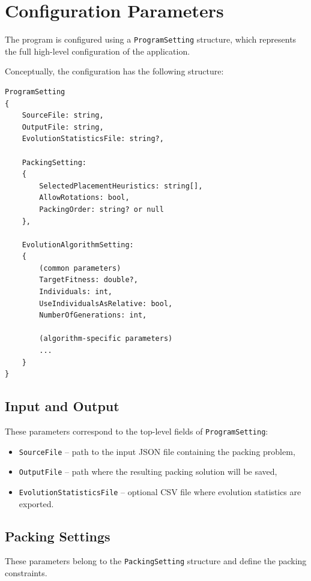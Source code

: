 \section{Configuration Parameters}

The program is configured using a \texttt{ProgramSetting} structure, which represents the full high-level configuration of the application.

Conceptually, the configuration has the following structure:

\begin{verbatim}
ProgramSetting
{
    SourceFile: string,
    OutputFile: string,
    EvolutionStatisticsFile: string?,

    PackingSetting:
    {
        SelectedPlacementHeuristics: string[],
        AllowRotations: bool,
        PackingOrder: string? or null
    },

    EvolutionAlgorithmSetting:
    {
        (common parameters)
        TargetFitness: double?,
        Individuals: int,
        UseIndividualsAsRelative: bool,
        NumberOfGenerations: int,

        (algorithm-specific parameters)
        ...
    }
}
\end{verbatim}

\subsection{Input and Output}

These parameters correspond to the top-level fields of \texttt{ProgramSetting}:

\begin{itemize}
    \item \texttt{SourceFile} -- path to the input JSON file containing the packing problem,
    
    \item \texttt{OutputFile} -- path where the resulting packing solution will be saved,
    
    \item \texttt{EvolutionStatisticsFile} -- optional CSV file where evolution statistics are exported.
\end{itemize}

\subsection{Packing Settings}

These parameters belong to the \texttt{PackingSetting} structure and define the packing constraints.

